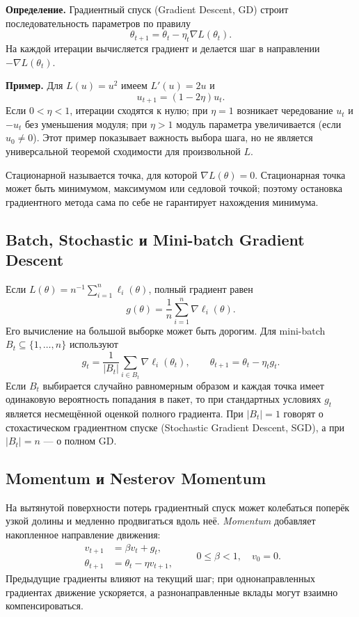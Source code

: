 \documentclass[12pt,a4paper]{article}
\begin{document}
\textbf{Определение.} Градиентный спуск (Gradient Descent, GD)
строит последовательность параметров по правилу
\begin{equation}
    \boxed{\theta_{t+1}=\theta_t-\eta_t\nabla L(\theta_t)}.
    \label{eq:gd}
\end{equation}
На каждой итерации вычисляется градиент и делается шаг
в направлении $-\nabla L(\theta_t)$.

\textbf{Пример.} Для $L(u)=u^2$ имеем $L'(u)=2u$ и
\[
    u_{t+1}=(1-2\eta)u_t.
\]
Если $0<\eta<1$, итерации сходятся к нулю;
при $\eta=1$ возникает чередование $u_t$ и $-u_t$ без уменьшения модуля;
при $\eta>1$ модуль параметра увеличивается (если $u_0\ne0$).
Этот пример показывает важность выбора шага, но не является
универсальной теоремой сходимости для произвольной $L$.

Стационарной называется точка, для которой $\nabla L(\theta)=0$.
Стационарная точка может быть минимумом, максимумом или седловой
точкой; поэтому остановка градиентного метода сама по себе
не гарантирует нахождения минимума.

\subsection{Batch, Stochastic и Mini-batch Gradient Descent}

Если $L(\theta)=n^{-1}\sum_{i=1}^{n}\ell_i(\theta)$,
полный градиент равен
\[
    g(\theta)=\frac1n\sum_{i=1}^{n}\nabla\ell_i(\theta).
\]
Его вычисление на большой выборке может быть дорогим.
Для mini-batch $B_t\subseteq\{1,\ldots,n\}$ используют
\[
    g_t=\frac1{|B_t|}\sum_{i\in B_t}\nabla\ell_i(\theta_t),
    \qquad \theta_{t+1}=\theta_t-\eta_tg_t.
\]
Если $B_t$ выбирается случайно равномерным образом и каждая точка
имеет одинаковую вероятность попадания в пакет, то при стандартных
условиях $g_t$ является несмещённой оценкой полного градиента.
При $|B_t|=1$ говорят о стохастическом градиентном спуске
(Stochastic Gradient Descent, SGD), а при $|B_t|=n$ --- о полном GD.

\subsection{Momentum и Nesterov Momentum}

На вытянутой поверхности потерь градиентный спуск может
колебаться поперёк узкой долины и медленно продвигаться
вдоль неё. \emph{Momentum} добавляет накопленное направление движения:
\begin{equation}
    \begin{aligned}
        v_{t+1}&=\beta v_t+g_t,\\
        \theta_{t+1}&=\theta_t-\eta v_{t+1},
    \end{aligned}
    \qquad 0\le\beta<1,\quad v_0=0.
    \label{eq:momentum}
\end{equation}
Предыдущие градиенты влияют на текущий шаг;
при однонаправленных градиентах движение ускоряется,
а разнонаправленные вклады могут взаимно компенсироваться.
\end{document}

